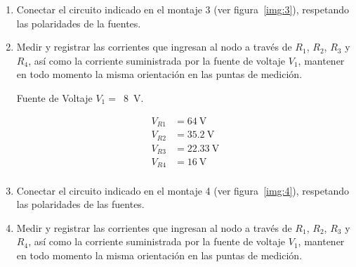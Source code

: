 \documentclass{article}
\begin{document}
\begin{enumerate}
        Fuente de Voltaje $V_1 =$~\SI{8}{\volt}.\\
        Fuente de Voltaje $V_2 =$~\SI{2}{\volt}. 

        \begin{align*}
            V_{R1} &= 1.061~\unit{\volt}\\
            V_{R2} &= 1.923~\unit{\volt}\\
            V_{R3} &= 2.839~\unit{\volt}\\
            V_{R4} &= 4.07~\unit{\volt}\\
        \end{align*}

        \item Conectar el circuito indicado en el montaje 3 (ver figura~\ref{img:3}), respetando las polaridades de la fuentes.
        
        \label{img:3}

        \item Medir y registrar las corrientes que ingresan al nodo a través de $R_1$, $R_2$, $R_3$ y $R_4$, así como la corriente suministrada por la fuente de voltaje $V_1$, mantener en todo momento la misma orientación en las puntas de medición.
        
        Fuente de Voltaje $V_1 =$~\SI{8}{\volt}.

        \begin{align*}
            V_{R1} &= 64~\unit{\volt}\\
            V_{R2} &= 35.2~\unit{\volt}\\
            V_{R3} &= 22.33~\unit{\volt}\\
            V_{R4} &= 16~\unit{\volt}\\
        \end{align*}

        \item Conectar el circuito indicado en el montaje 4 (ver figura~\ref{img:4}), respetando las polaridades de las fuentes.
        
        \label{img:4}

        \item Medir y registrar las corrientes que ingresan al nodo a través de $R_1$, $R_2$, $R_3$ y $R_4$, así como la corriente suministrada por la fuente de voltaje $V_1$, mantener en todo momento la misma orientación en las puntas de medición.
        

\end{enumerate}
\end{document}
